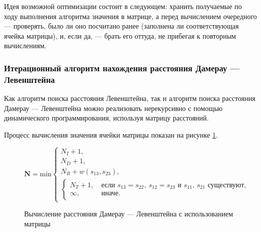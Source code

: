 Идея возможной оптимизации состоит в следующем: хранить получаемые по ходу выполнения алгоритма значения в матрице, а перед вычислением очередного --- проверять, было ли оно посчитано ранее (заполнена ли соответствующая ячейка матрицы), и, если да, --- брать его оттуда, не прибегая к повторным вычислениям.

\subsubsection{Итерационный алгоритм нахождения расстояния Дамерау --- Левенштейна}

Как алгоритм поиска расстояния Левенштейна, так и алгоритм поиска расстояния Дамерау --- Левенштейна можно реализовать нерекурсивно с помощью динамического программирования, используя матрицу расстояний.

Процесс вычисления значения ячейки матрицы показан на рисунке \ref{fig:dlmat}.

\begin{figure}[H]
    \begin{center}

        \( \boldsymbol{N} =
        \mathrm{min} \begin{cases}
    N_I + 1, \\
    N_D + 1, \\
    N_R + w(s_{13}, s_{23}), \\
            \begin{cases}
                N_T + 1,\ &\text{если $s_{13} = s_{22},\ s_{12} = s_{23}$ и $s_{11}$, $s_{21}$ существуют}, \\
                \infty,\ &\text{иначе}.
            \end{cases}
\end{cases} \)
    \end{center}
    \caption{Вычисление расстояния Дамерау --- Левенштейна с использованием матрицы}
    \label{fig:dlmat}
\end{figure}

